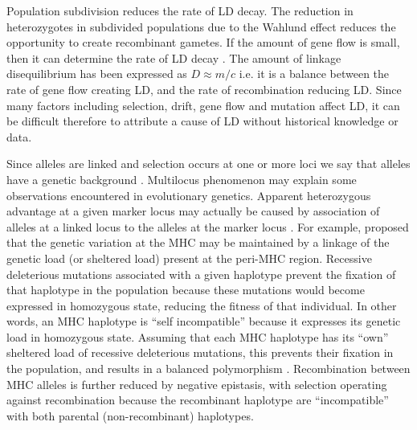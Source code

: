 Population subdivision reduces the rate of LD decay.
The reduction in heterozygotes in subdivided populations due to the Wahlund effect \parencite{Wahlund1928} reduces the opportunity to create recombinant gametes.
If the amount of gene flow is small, then it can determine the rate of LD decay \parencite{Nei1973}.
The amount of linkage disequilibrium has been expressed as $D\approx m/c$ \parencite{Barton2007} i.e. it is a balance between the rate of gene flow creating LD, and the rate of recombination reducing LD.
Since many factors including selection, drift, gene flow and mutation affect LD, it can be difficult therefore to attribute a cause of LD without historical knowledge or data.

Since alleles are linked and selection occurs at one or more loci we say that alleles have a genetic background \parencite{Hedrick2010}.
Multilocus phenomenon may explain some observations encountered in evolutionary genetics.
Apparent heterozygous advantage at a given marker locus may actually be caused by association of alleles at a linked locus to the alleles at the marker locus \parencite{Ohta1971}.
For example, \cite{VanOosterhout2009} proposed that the genetic variation at the MHC may be maintained by a linkage of the genetic load (or sheltered load) present at the peri-MHC region.
Recessive deleterious mutations associated with a given haplotype prevent the fixation of that haplotype in the population because these mutations would become expressed in homozygous state, reducing the fitness of that individual.
In other words, an MHC haplotype is “self incompatible” because it expresses its genetic load in homozygous state.
Assuming that each MHC haplotype has its “own” sheltered load of recessive deleterious mutations, this prevents their fixation in the population, and results in a balanced polymorphism \parencite{VanOosterhout2009}.
Recombination between MHC alleles is further reduced by negative epistasis, with selection operating against recombination because the recombinant haplotype are “incompatible” with both parental (non-recombinant) haplotypes.

